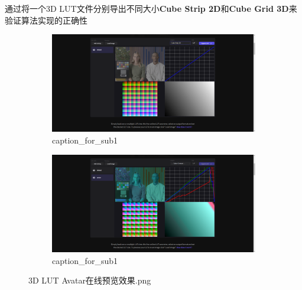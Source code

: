 \documentclass{ctexart}
\begin{document}
    通过将一个3D LUT文件分别导出不同大小\textbf{Cube Strip 2D}和\textbf{Cube Grid 3D}来验证算法实现的正确性
    \begin{figure}[!htbp]
    	\centering
    	\begin{subfigure}{0.49\textwidth}
    		\includegraphics[width=\textwidth]{color.io_lut_converter_default.png}
    		\caption{caption\_for\_sub1}
    	\end{subfigure}
    	\begin{subfigure}{0.49\textwidth}
    		\includegraphics[width=\textwidth]{color.io_lut_converter_avatar.png}
    		\caption{caption\_for\_sub1}
    	\end{subfigure}      
    	\caption{3D LUT Avatar在线预览效果.png}
    \end{figure}
    
\end{document}
